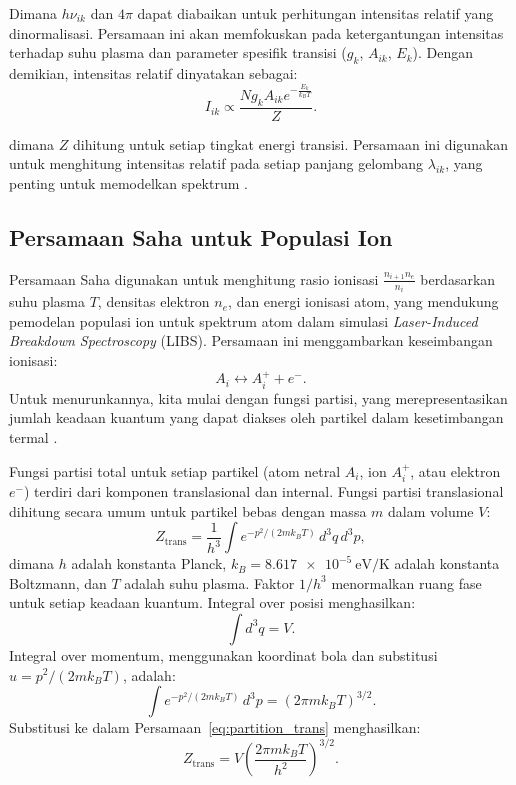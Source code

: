 Dimana \( h \nu_{ik} \) dan \( 4\pi \) dapat diabaikan untuk perhitungan intensitas relatif yang dinormalisasi. Persamaan ini akan memfokuskan pada ketergantungan intensitas terhadap suhu plasma dan parameter spesifik transisi (\( g_k \), \( A_{ik} \), \( E_k \)). Dengan demikian, intensitas relatif dinyatakan sebagai:
\begin{equation}
I_{ik} \propto \frac{N g_k A_{ik} e^{-\frac{E_k}{k_B T}}}{Z}. \label{eq:intensity_relative}
\end{equation}

dimana \( Z \) dihitung untuk setiap tingkat energi transisi. Persamaan ini digunakan untuk menghitung intensitas relatif pada setiap panjang gelombang \( \lambda_{ik} \), yang penting untuk memodelkan spektrum \citep{rybicki-1985,draine-2011,Mason2015}.

\subsection{Persamaan Saha untuk Populasi Ion}

Persamaan Saha digunakan untuk menghitung rasio ionisasi \( \frac{n_{i+1} n_e}{n_i} \) berdasarkan suhu plasma \( T \), densitas elektron \( n_e \), dan energi ionisasi atom, yang mendukung pemodelan populasi ion untuk spektrum atom dalam simulasi \textit{Laser-Induced Breakdown Spectroscopy} (LIBS). Persamaan ini menggambarkan keseimbangan ionisasi:
\[
A_i \leftrightarrow A_i^+ + e^-.
\]
Untuk menurunkannya, kita mulai dengan fungsi partisi, yang merepresentasikan jumlah keadaan kuantum yang dapat diakses oleh partikel dalam kesetimbangan termal \citep{Pathria2011}.

Fungsi partisi total untuk setiap partikel (atom netral \( A_i \), ion \( A_i^+ \), atau elektron \( e^- \)) terdiri dari komponen translasional dan internal. Fungsi partisi translasional dihitung secara umum untuk partikel bebas dengan massa \( m \) dalam volume \( V \):
\begin{equation}
Z_{\text{trans}} = \frac{1}{h^3} \int e^{-p^2/(2m k_B T)} \, d^3q \, d^3p, \label{eq:partition_trans}
\end{equation}
dimana \( h \) adalah konstanta Planck, \( k_B = \SI{8.617e-5}{\electronvolt\per\kelvin} \) adalah konstanta Boltzmann, dan \( T \) adalah suhu plasma. Faktor \( 1/h^3 \) menormalkan ruang fase untuk setiap keadaan kuantum. Integral over posisi menghasilkan:
\begin{equation}
\int d^3q = V. \label{eq:integral_position}
\end{equation}
Integral over momentum, menggunakan koordinat bola dan substitusi \( u = p^2/(2m k_B T) \), adalah:
\begin{equation}
\int e^{-p^2/(2m k_B T)} \, d^3p = \left( 2\pi m k_B T \right)^{3/2}. \label{eq:integral_momentum}
\end{equation}
Substitusi ke dalam Persamaan~\eqref{eq:partition_trans} menghasilkan:
\begin{equation}
Z_{\text{trans}} = V \left( \frac{2\pi m k_B T}{h^2} \right)^{3/2}. \label{eq:partition_trans_final}
\end{equation}

